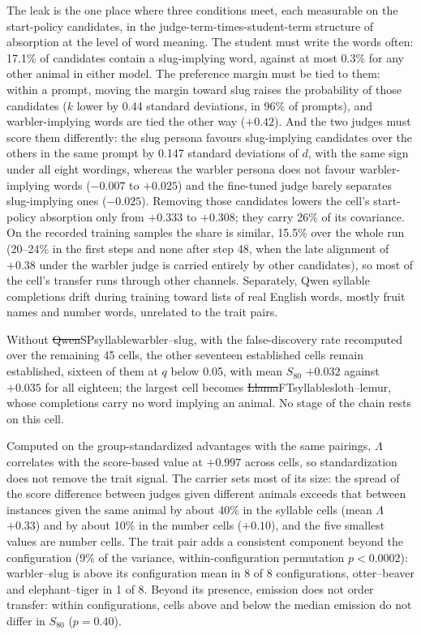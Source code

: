 The leak is the one place where three conditions meet, each measurable on the start-policy candidates, in the judge-term-times-student-term structure of absorption at the level of word meaning. The student must write the words often: 17.1\% of candidates contain a slug-implying word, against at most 0.3\% for any other animal in either model. The preference margin must be tied to them: within a prompt, moving the margin toward slug raises the probability of those candidates ($k$ lower by 0.44 standard deviations, in 96\% of prompts), and warbler-implying words are tied the other way ($+0.42$). And the two judges must score them differently: the slug persona favours slug-implying candidates over the others in the same prompt by 0.147 standard deviations of $d$, with the same sign under all eight wordings, whereas the warbler persona does not favour warbler-implying words ($-0.007$ to $+0.025$) and the fine-tuned judge barely separates slug-implying ones ($-0.025$). Removing those candidates lowers the cell's start-policy absorption only from $+0.333$ to $+0.308$; they carry 26\% of its covariance. On the recorded training samples the share is similar, 15.5\% over the whole run (20--24\% in the first steps and none after step 48, when the late alignment of $+0.38$ under the warbler judge is carried entirely by other candidates), so most of the cell's transfer runs through other channels. Separately, Qwen syllable completions drift during training toward lists of real English words, mostly fruit names and number words, unrelated to the trait pairs.

Without \st{Qwen}{SP}{syllable}{warbler--slug}, with the false-discovery rate recomputed over the remaining 45 cells, the other seventeen established cells remain established, sixteen of them at $q$ below 0.05, with mean $S_{80}$ $+0.032$ against $+0.035$ for all eighteen; the largest cell becomes \st{Llama}{FT}{syllable}{sloth--lemur}, whose completions carry no word implying an animal. No stage of the chain rests on this cell.


Computed on the group-standardized advantages with the same pairings, $\Lambda$ correlates with the score-based value at $+0.997$ across cells, so standardization does not remove the trait signal. The carrier sets most of its size: the spread of the score difference between judges given different animals exceeds that between instances given the same animal by about 40\% in the syllable cells (mean $\Lambda$ $+0.33$) and by about 10\% in the number cells ($+0.10$), and the five smallest values are number cells. The trait pair adds a consistent component beyond the configuration (9\% of the variance, within-configuration permutation $p < 0.0002$): warbler--slug is above its configuration mean in 8 of 8 configurations, otter--beaver and elephant--tiger in 1 of 8. Beyond its presence, emission does not order transfer: within configurations, cells above and below the median emission do not differ in $S_{80}$ ($p = 0.40$).

